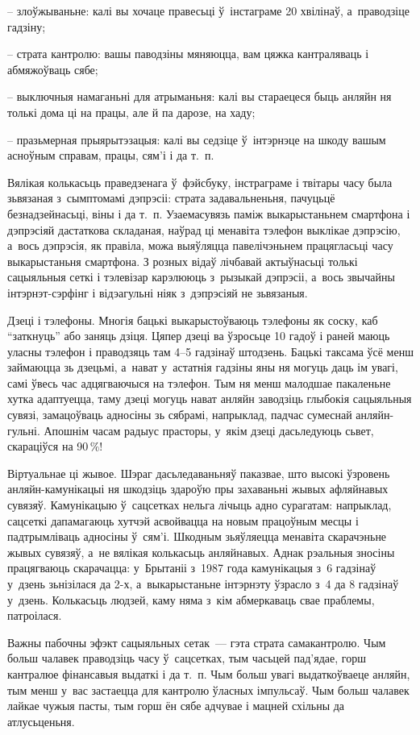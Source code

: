 – злоўжываньне: калі вы хочаце правесьці ў~інстаграме 20 хвілінаў, а~праводзіце гадзіну;

– страта кантролю: вашы паводзіны мяняюцца, вам цяжка кантраляваць і абмяжоўваць сябе;

– выключныя намаганьні для атрыманьня: калі вы стараецеся быць анляйн ня толькі дома ці на працы, але й па дарозе, на хаду;

– празьмерная прыярытэзацыя: калі вы седзіце ў~інтэрнэце на шкоду вашым асноўным справам, працы, сям'і і да т.~п.

Вялікая колькасьць праведзенага ў~фэйсбуку, інстраграме і твітары часу была зьвязаная з~сымптомамі дэпрэсіі: страта задавальненьня, пачуцьцё безнадзейнасьці, віны і да т.~п. Узаемасувязь паміж выкарыстаньнем смартфона і дэпрэсіяй дастаткова складаная, наўрад ці менавіта тэлефон выклікае дэпрэсію, а~вось дэпрэсія, як правіла, можа выяўляцца павелічэньнем працягласьці часу выкарыстаньня смартфона. З розных відаў лічбавай актыўнасьці толькі сацыяльныя сеткі і тэлевізар карэлююць з~рызыкай дэпрэсіі, а~вось звычайны інтэрнэт-сэрфінг і відэагульні ніяк з~дэпрэсіяй не зьвязаныя.

Дзеці і тэлефоны. Многія бацькі выкарыстоўваюць тэлефоны як соску, каб ``заткнуць'' або заняць дзіця. Цяпер дзеці ва ўзросьце 10 гадоў і раней маюць уласны тэлефон і праводзяць там 4--5 гадзінаў штодзень. Бацькі таксама ўсё менш займаюцца зь дзецьмі, а~нават у~астатнія гадзіны яны ня могуць даць ім увагі, самі ўвесь час адцягваючыся на тэлефон. Тым ня менш малодшае пакаленьне хутка адаптуецца, таму дзеці могуць нават анляйн заводзіць глыбокія сацыяльныя сувязі, замацоўваць адносіны зь сябрамі, напрыклад, падчас сумеснай анляйн-гульні. Апошнім часам радыус прасторы, у~якім дзеці дасьледуюць сьвет, скараціўся на 90\,\%!

Віртуальнае ці жывое. Шэраг дасьледаваньняў паказвае, што высокі ўзровень анляйн-камунікацыі ня шкодзіць здароўю пры захаваньні жывых афляйнавых сувязяў. Камунікацыю ў~сацсетках нельга лічыць адно сурагатам: напрыклад, сацсеткі дапамагаюць хутчэй асвойвацца на новым працоўным месцы і падтрымліваць адносіны ў~сям'і. Шкодным зьяўляецца менавіта скарачэньне жывых сувязяў, а~не вялікая колькасьць анляйнавых. Аднак рэальныя зносіны працягваюць скарачацца: у~Брытаніі з~1987 года камунікацыя з~6 гадзінаў у~дзень зьнізілася да 2-х, а~выкарыстаньне інтэрнэту ўзрасло з~4 да 8 гадзінаў у~дзень. Колькасьць людзей, каму няма з~кім абмеркаваць свае праблемы, патроілася.

Важны пабочны эфэкт сацыяльных сетак~--- гэта страта самакантролю. Чым больш чалавек праводзіць часу ў~сацсетках, тым часьцей пад'ядае, горш кантралюе фінансавыя выдаткі і да т.~п. Чым больш увагі выдаткоўваеце анляйн, тым менш у~вас застаецца для кантролю ўласных імпульсаў. Чым больш чалавек лайкае чужыя пасты, тым горш ён сябе адчувае і мацней схільны да атлусьценьня.


